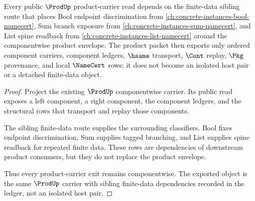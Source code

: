 \begin{theorem}
\label{thm:prod-orphan-product-carrier-dependency}
Every public $\ProdUp$ product-carrier read depends on the finite-data sibling route that places Bool endpoint discrimination from \autoref{ch:concrete-instances-bool-namecert}, Sum branch exposure from \autoref{ch:concrete-instances-sum-namecert}, and List spine readback from \autoref{ch:concrete-instances-list-namecert} around the componentwise product envelope. The product packet then exports only ordered component carriers, component ledgers, $\hsame$ transport, $\Cont$ replay, $\Pkg$ provenance, and local $\NameCert$ rows; it does not become an isolated host pair or a detached finite-data object.
\end{theorem}
\begin{proof}
Project the existing $\ProdUp$ componentwise carrier. Its public read exposes a left component, a right component, the component ledgers, and the structural rows that transport and replay those components.

The sibling finite-data route supplies the surrounding classifiers. Bool fixes endpoint discrimination, Sum supplies tagged branching, and List supplies spine readback for repeated finite data. These rows are dependencies of downstream product consumers, but they do not replace the product envelope.

Thus every product-carrier exit remains componentwise. The exported object is the same $\ProdUp$ carrier with sibling finite-data dependencies recorded in the ledger, not an isolated host pair.
\end{proof}
